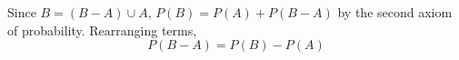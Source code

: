 Since $B = (B-A) \cup A$, $P(B) = P(A) + P(B - A)$ by the second axiom of
 probability. Rearranging terms,
$$P(B-A) = P(B) - P(A)$$